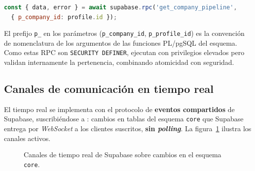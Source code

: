 \begin{lstlisting}[language=JavaScript, caption={Invocación de una RPC con parámetros tipados (real).}, label={lst:rpc-call}]
const { data, error } = await supabase.rpc('get_company_pipeline',
  { p_company_id: profile.id });
\end{lstlisting}

\begin{AvisoNota}
El prefijo \texttt{p\_} en los parámetros (\texttt{p\_company\_id}, \texttt{p\_profile\_id})
es la convención de nomenclatura de los argumentos de las funciones PL/pgSQL del esquema.
Como estas RPC son \texttt{SECURITY DEFINER}, ejecutan con privilegios elevados pero validan
internamente la pertenencia, combinando atomicidad con seguridad.
\end{AvisoNota}

\subsection{Canales de comunicación en tiempo real}
\label{subsec:supabase_realtime}

El tiempo real se implementa con el protocolo de \textbf{eventos compartidos} de Supabase,
suscribiéndose a : cambios en tablas del esquema \texttt{core}
que Supabase entrega por \textit{WebSocket} a los clientes suscritos, \textbf{sin
\textit{polling}}. La figura~\ref{fig:rt-canales} ilustra los canales activos.

\vspace{0.3cm}
\begin{figure}[h!]
\centering
{}
\caption{Canales de tiempo real de Supabase sobre cambios en el esquema \texttt{core}.}
\label{fig:rt-canales}
\end{figure}

